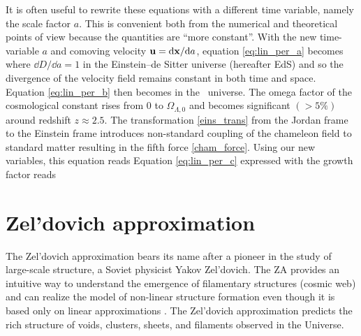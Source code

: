 It is often useful to rewrite these equations with a different time variable, namely the scale factor $a$. This is convenient both from the numerical and theoretical points of view because the quantities are ``more constant''. With the new time-variable $a$ and comoving velocity $\mathbf u = \mbox{d} \mathbf x/\mbox{d} a$, equation \eqref{eq:lin_per_a} becomes
where $\dd D/\dd a = 1$ in the Einstein--de Sitter universe (hereafter EdS) and so the divergence of the velocity field remains constant in both time and space. Equation \eqref{eq:lin_per_b} then becomes
in the \LCDM\ universe. The omega factor of the cosmological constant
rises from $0$ to $\Omega_{\Lambda,0}$ and becomes significant $(>5\%)$ around redshift $z\approx2.5$. The transformation \eqref{eins_trans} from the Jordan frame to the Einstein frame introduces non-standard coupling of the chameleon field to standard matter resulting in the fifth force \eqref{cham_force}. Using our new variables, this equation reads
Equation \eqref{eq:lin_per_c} expressed with the growth factor reads
\section{Zel'dovich approximation}
The Zel'dovich approximation \parencite[hereafter ZA;][]{1970A&A.....5...84Z} bears its name after a pioneer in the study of large-scale structure, a Soviet physicist Yakov Zel'dovich. The ZA provides an intuitive way to understand the emergence of filamentary structures (cosmic web) and can realize the model of non-linear structure formation even though it is based only on linear approximations \parencite{2014MNRAS.439.3630W}. The Zel’dovich approximation predicts the rich structure of voids, clusters, sheets, and filaments observed in the Universe.

